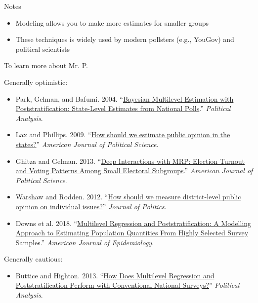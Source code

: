 \documentclass[aspectratio=169]{beamer}
\begin{document}

\begin{frame}{Notes}

\begin{itemize}
\item Modeling allows you to make more estimates for smaller groups \pause
\item These techniques is widely used by modern pollsters (e.g., YouGov) and political scientists \pause
\end{itemize}

\end{frame}

\begin{frame}{To learn more about Mr. P.}

{\footnotesize
Generally optimistic:
\begin{itemize}
\item Park, Gelman, and Bafumi. 2004. ``\textcolor{blue}{\href{https://www.jstor.org/stable/25791784}{Bayesian Multilevel Estimation with Poststratification: State-Level Estimates from National Polls}}.'' \textit{Political Analysis}.
\item Lax and Phillips. 2009. ``\textcolor{blue}{\href{https://www.jstor.org/stable/25193870}{How should we estimate public opinion in the states?}}'' \textit{American Journal of Political Science}.
\item Ghitza and Gelman. 2013. ``\textcolor{blue}{\href{https://www.jstor.org/stable/23496652}{Deep Interactions with MRP: Election Turnout and Voting Patterns Among Small Electoral Subgroups}}.'' \textit{American Journal of Political Science}.
\item Warshaw and Rodden. 2012. ``\textcolor{blue}{\href{http://www.jstor.org/stable/10.1017/s0022381611001204}{How should we measure district-level public opinion on individual issues?}}'' \textit{Journal of Politics}.
\item Downs et al. 2018. ``\textcolor{blue}{\href{https://doi.org/10.1093/aje/kwy070}{Multilevel Regression and Poststratification: A Modelling Approach to Estimating Population Quantities From Highly Selected Survey Samples}}.'' \textit{American Journal of Epidemiology}.
\end{itemize}
Generally cautious:
\begin{itemize}
\item Buttice and Highton. 2013. ``\textcolor{blue}{\href{http://www.jstor.org/stable/24572674}{How Does Multilevel Regression and Poststratification Perform with Conventional National Surveys?}}'' \textit{Political Analysis}.
\end{itemize}
}

\end{frame}
\end{document}
